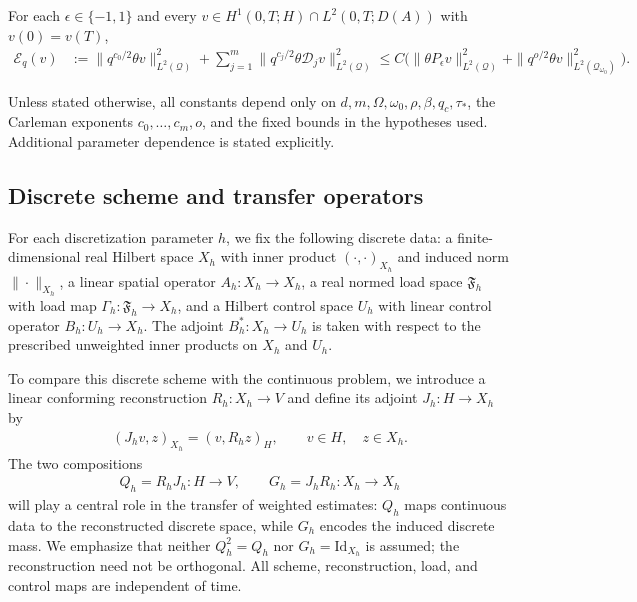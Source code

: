 \documentclass[print,wide,eng]{draft}
\begin{document}
\begin{enumerate}[label=\textbf{(A\arabic*)},ref=(A\arabic*)]
For each $\epsilon\in\{-1,1\}$ and every $v\in H^1(0,T;H)\cap L^2(0,T;D(A))$ with $v(0)=v(T)$,
%
\begin{align}\label{eq:continuousabstract}
\mathcal E_q(v)&:=\|q^{c_0/2}\theta v\|_{L^2(\mathcal Q)}^2+
\sum_{j=1}^m\|q^{c_j/2}\theta\mathcal D_jv\|_{L^2(\mathcal Q)}^2
\leq C\bigl(\|\theta P_\epsilon v\|_{L^2(\mathcal Q)}^2+
\|q^{o/2}\theta v\|_{L^2(\mathcal Q_{\omega_0})}^2\bigr).
\end{align}
%
\end{enumerate}
%

Unless stated otherwise, all constants depend only on $d,m,\Omega,\omega_0,\rho,\beta,q_c,\tau_*$, the Carleman exponents $c_0,\ldots,c_m,o$, and the fixed bounds in the hypotheses used. Additional parameter dependence is stated explicitly.


\subsection{Discrete scheme and transfer operators}

For each discretization parameter $h$, we fix the following discrete data: a finite-dimensional real Hilbert space $X_h$ with inner product $(\cdot,\cdot)_{X_h}$ and induced norm $\|\cdot\|_{X_h}$, a linear spatial operator $A_h:X_h\to X_h$, a real normed load space $\mathfrak F_h$ with load map $\Gamma_h:\mathfrak F_h\to X_h$, and a Hilbert control space $U_h$ with linear control operator $B_h:U_h\to X_h$.
The adjoint $B_h^*:X_h\to U_h$ is taken with respect to the prescribed unweighted inner products on $X_h$ and $U_h$.

To compare this discrete scheme with the continuous problem, we introduce a linear conforming reconstruction $R_h:X_h\to V$ and define its adjoint $J_h:H\to X_h$ by
\begin{align}\label{eq:massinterface}
(J_hv,z)_{X_h}=(v,R_hz)_H,\qquad v\in H,\quad z\in X_h.
\end{align}
The two compositions
\begin{align}\label{eq:transfer-compositions}
Q_h=R_hJ_h:H\to V,\qquad G_h=J_hR_h:X_h\to X_h
\end{align}
will play a central role in the transfer of weighted estimates: $Q_h$ maps continuous data to the reconstructed discrete space, while $G_h$ encodes the induced discrete mass. We emphasize that neither $Q_h^2=Q_h$ nor $G_h=\mathrm{Id}_{X_h}$ is assumed; the reconstruction need not be orthogonal.
All scheme, reconstruction, load, and control maps are independent of time.
\end{document}
